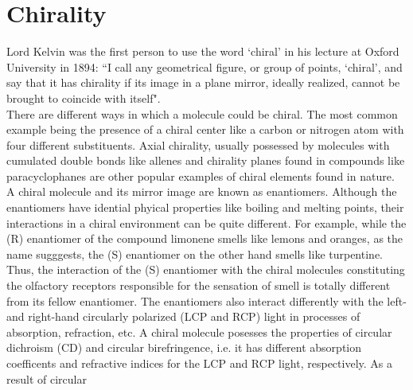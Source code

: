 
\section{Chirality}
Lord Kelvin was the first person to use the word `chiral' in his lecture 
at Oxford University in 1894: ``I call any geometrical figure, or group of points, 
`chiral', and say that it has chirality if its image in a plane mirror, ideally realized, 
cannot be brought to coincide with itself"\cite{Kelvin}. 
\\
There are different ways in which a molecule 
could be chiral. The most common example being the presence of a chiral center 
like a carbon or nitrogen atom with four different substituents. Axial chirality, usually 
possessed by molecules with cumulated double bonds like allenes and chirality planes 
found in compounds like paracyclophanes are other popular examples of chiral elements 
found in nature. \\
A chiral molecule and its mirror image are known as enantiomers. Although the
enantiomers have idential phyical properties like boiling and melting points, their
interactions in a chiral environment can be quite different. For example,
while the (R) enantiomer of the compound limonene smells like lemons and oranges,
as the name sugggests, the (S) enantiomer on the other hand smells like turpentine. 
Thus, the interaction of the (S) enantiomer with the chiral molecules constituting the olfactory receptors 
responsible for the sensation of smell is totally different from its fellow enantiomer.
The enantiomers also interact differently with the left- and right-hand circularly polarized (LCP and
RCP) light in processes of absorption, refraction, etc. A chiral molecule posesses the 
properties of circular dichroism (CD) and circular birefringence, i.e. it has different absorption 
coefficents and refractive indices for the LCP and RCP light, respectively. As a result of circular 
